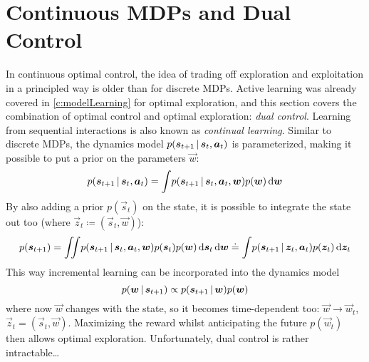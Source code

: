 	\section{Continuous MDPs and Dual Control}
		In continuous optimal control, the idea of trading off exploration and exploitation in a principled way is older than for discrete MDPs. Active learning was already covered in \autoref{c:modelLearning} for optimal exploration, and this section covers the combination of optimal control and optimal exploration: \emph{dual control}. Learning from sequential interactions is also known as \emph{continual learning}. Similar to discrete MDPs, the dynamics model \( p(\bm{s}_{t + 1} \,\vert\, \bm{s}_t, \bm{a}_t) \) is parameterized, making it possible to put a prior on the parameters \(\vec{w}\):
		\begin{equation*}
			p(\bm{s}_{t + 1} \,\vert\, \bm{s}_t, \bm{a}_t) = \int\! p(\bm{s}_{t + 1} \,\vert\, \bm{s}_t, \bm{a}_t, \bm{w}) p(\bm{w}) \dd{\bm{w}}
		\end{equation*}
		By also adding a prior \(p(\vec{s}_t)\) on the state, it is possible to integrate the state out too (where \( \vec{z}_t \coloneqq (\vec{s}_t, \vec{w}) \)):
		\begin{equation*}
			p(\bm{s}_{t + 1})
				= \iint\! p(\bm{s}_{t + 1} \,\vert\, \bm{s}_t, \bm{a}_t, \bm{w}) p(\bm{s}_t) p(\bm{w}) \dd{\bm{s}_t} \dd{\bm{w}}
				\doteq \int\! p(\bm{s}_{t + 1} \,\vert\, \bm{z}_t, \bm{a}_t) p(\bm{z}_t) \dd{\bm{z}_t}
		\end{equation*}
		This way incremental learning can be incorporated into the dynamics model
		\begin{equation*}
			p(\bm{w} \,\vert\, \bm{s}_{t + 1}) \propto p(\bm{s}_{t + 1} \,\vert\, \bm{w}) p(\bm{w})
		\end{equation*}
		where now \( \vec{w} \) changes with the state, so it becomes time-dependent too: \( \vec{w} \to \vec{w}_t \), \( \vec{z}_t = (\vec{s}_t, \vec{w}) \). Maximizing the reward whilst anticipating the future \( p(\vec{w}_t) \) then allows optimal exploration. Unfortunately, dual control is rather intractable\dots

